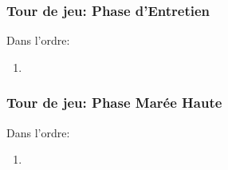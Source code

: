 \documentclass[11pt]{beamer}
\begin{document}
	\begin{frame}
		\frametitle{Tour de jeu: Phase d'Entretien}
		
		Dans l'ordre:
		\begin{enumerate}
			\item 
		\end{enumerate}
	\end{frame}
	\begin{frame}
		\frametitle{Tour de jeu: Phase Marée Haute}
		
		Dans l'ordre:
		\begin{enumerate}
			\item 
		\end{enumerate}
	\end{frame}


%		
%	
%
%		
\end{document}
